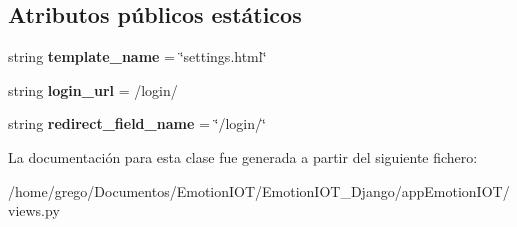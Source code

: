 \subsection*{Atributos públicos estáticos}
\begin{DoxyCompactItemize}
\item 
string {\bfseries template\+\_\+name} = \char`\"{}settings.\+html\char`\"{}\hypertarget{classappEmotionIOT_1_1views_1_1Settings_a8b2a8ab799d3925c77f2a051434d0e03}{}\label{classappEmotionIOT_1_1views_1_1Settings_a8b2a8ab799d3925c77f2a051434d0e03}

\item 
string {\bfseries login\+\_\+url} = \textquotesingle{}/login/\textquotesingle{}\hypertarget{classappEmotionIOT_1_1views_1_1Settings_ae112342ffa1d8267cdaea1c260e5f029}{}\label{classappEmotionIOT_1_1views_1_1Settings_ae112342ffa1d8267cdaea1c260e5f029}

\item 
string {\bfseries redirect\+\_\+field\+\_\+name} = \char`\"{}/login/\char`\"{}\hypertarget{classappEmotionIOT_1_1views_1_1Settings_a86ba3d553c3b2fbc095e6e63f2fe3918}{}\label{classappEmotionIOT_1_1views_1_1Settings_a86ba3d553c3b2fbc095e6e63f2fe3918}

\end{DoxyCompactItemize}


La documentación para esta clase fue generada a partir del siguiente fichero\+:\begin{DoxyCompactItemize}
\item 
/home/grego/\+Documentos/\+Emotion\+I\+O\+T/\+Emotion\+I\+O\+T\+\_\+\+Django/app\+Emotion\+I\+O\+T/views.\+py\end{DoxyCompactItemize}
